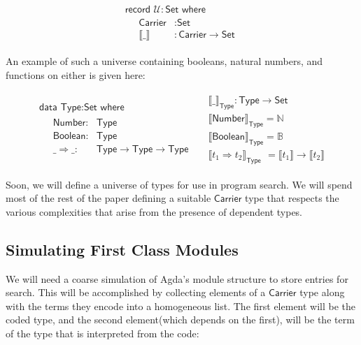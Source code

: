 \documentclass[acmsmall,review,authorversion]{acmart}
\newcommand{\term}[1]{\textsf{#1}}
\newcommand{\type}[1]{\textsf{#1}}
\newcommand{\Carrier}{\term{Carrier}}
\newcommand{\Universe}{\mathcal{U}}
\newcommand{\Set}{\type{Set}}
\newcommand{\Type}{\type{Type}}
\newcommand{\Interp}[1]{\llbracket #1 \rrbracket}
\newcommand{\?}{\stackrel{?}{\approx}}
\newcommand{\data}[2]{\textsf{data } #1 : #2 \textsf{ where}}
\newcommand{\record}[2]{\textsf{record } #1 : #2 \textsf{ where}}
\begin{document}
$$
\begin{array}{l}
\record{\Universe}{\Set}\\
\quad  \begin{array}{rl}
         \Carrier &: \Set \\
         \Interp{\_} &: \Carrier \rightarrow \Set
       \end{array}
\end{array}
$$

An example of such a universe containing booleans, natural numbers, and
functions on either is given here:

$$
\begin{array}{cc}
\begin{array}{l}
\data{\Type}{\Set}\\
\quad \begin{array}{rl}
        \textsf{Number} :& \Type\\
        \textsf{Boolean} :& \Type\\
        \_\Rightarrow\_ :& \Type \rightarrow \Type \rightarrow \Type
      \end{array}
\end{array}
&
\begin{array}{l}
  \Interp{\_}_{\Type} : \Type \rightarrow \Set\\
  \Interp{\textsf{Number}}_{\Type}     = \mathbb{N}\\
  \Interp{\textsf{Boolean}}_{\Type}    = \mathbb{B}\\
  \Interp{t_1 \Rightarrow t_2}_{\Type} \ \, = \Interp{t_1} \rightarrow \Interp{t_2}
\end{array}
\end{array}
$$

Soon, we will define a universe of types for use in program search. We will
spend most of the rest of the paper defining a suitable $\Carrier$ type that
respects the various complexities that arise from the presence of dependent
types. 

\subsection{Simulating First Class Modules}

We will need a coarse simulation of Agda's module structure to store entries for
search. This will be accomplished by collecting elements of a $\Carrier$ type
along with the terms they encode into a homogeneous list. The first element will
be the coded type, and the second element(which depends on the first), will be
the term of the type that is interpreted from the code:
\end{document}
